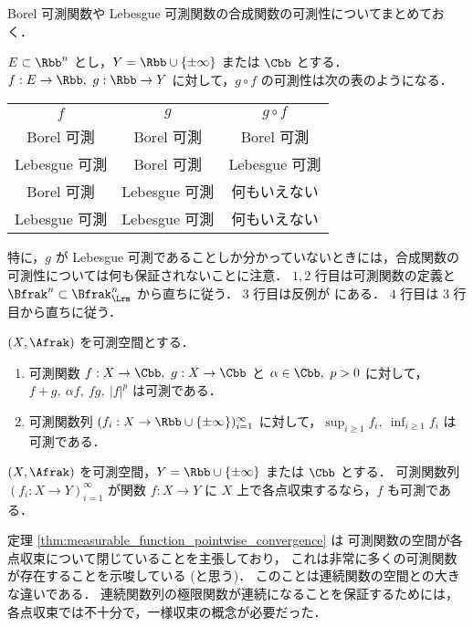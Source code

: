 \begin{remark}
    Borel 可測関数や Lebesgue 可測関数の合成関数の可測性についてまとめておく．

    $E\subset\Rbb^n$ とし，$Y=\Rbb\cup\{\pm\infty\} $ または $\Cbb$ とする．
    $f:E\to\Rbb,\ g:\Rbb\to Y$ に対して，$g\circ f$ の可測性は次の表のようになる．

    \begin{table}[h]
        \centering
        \begin{tabular}{|c|c||c|}
            \hline
            $f$ & $g$ & $g\circ f$\\
            \hhline{|=|=#=|}
            Borel 可測 & Borel 可測 & Borel 可測\\
            \hline
            Lebesgue 可測 & Borel 可測 & Lebesgue 可測\\
            \hline
            Borel 可測 & Lebesgue 可測 & 何もいえない\\
            \hline
            Lebesgue 可測 & Lebesgue 可測 & 何もいえない\\
            \hline
        \end{tabular}
    \end{table}

    特に，$g$ が Lebesgue 可測であることしか分かっていないときには，合成関数の可測性については何も保証されないことに注意．
    $1,2$ 行目は可測関数の定義と $\Bfrak^n\subset\Bfrak_\Lrm^n$ から直ちに従う．
    $3$ 行目は反例が \cite[pp.72--73]{It63} にある．
    $4$ 行目は $3$ 行目から直ちに従う．
\end{remark}

\begin{theorem}\label{thm:elementary_measuable_functions}
    $(X,\Afrak)$ を可測空間とする．
    \begin{enumerate}
        \item 可測関数 $f:X\to\Cbb,\ g:X\to\Cbb$ と $\alpha\in\Cbb,\ p>0$ に対して，$f+g,\ \alpha f,\ fg,\ |f|^p$ は可測である．
        \item 可測関数列 $(f_i:X\to\Rbb\cup\{\pm\infty\})_{i=1}^\infty$ に対して，$\displaystyle\sup_{i\ge1}f_i,\ \inf_{i\ge1}f_i$ は可測である．
    \end{enumerate}
\end{theorem}

\begin{theorem}\label{thm:measurable_function_pointwise_convergence}
    $(X,\Afrak)$ を可測空間，$Y=\Rbb\cup\{\pm\infty\}$ または $\Cbb$ とする．
    可測関数列 $(f_i:X\to Y)_{i=1}^\infty$ が関数 $f:X\to Y$ に $X$ 上で各点収束するなら，$f$ も可測である．
\end{theorem}

\begin{remark}
    定理 \ref{thm:measurable_function_pointwise_convergence} は
    可測関数の空間が各点収束について閉じていることを主張しており，
    これは非常に多くの可測関数が存在することを示唆している (と思う)．
    このことは連続関数の空間との大きな違いである．
    連続関数列の極限関数が連続になることを保証するためには，各点収束では不十分で，一様収束の概念が必要だった．
\end{remark}
